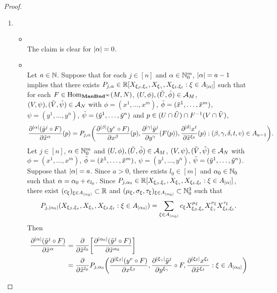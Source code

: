 \documentclass{book}
\begin{document}
\begin{proof}\
	\begin{enumerate}
		\item 
		\begin{itemize}
			\item {} \\
			The claim is clear for $|\alpha| = 0$. 
			\item {} \\
			Let $a \in \mathbb{N}$. Suppose that for each $j \in [n]$ and $\alpha \in \mathbb{N}_0^m$, $|\alpha| = a - 1$ implies that there exists $P_{j, \alpha} \in \mathbb{R}[X_{\xi_{\beta}, \xi_v}, X_{\xi_{\gamma}}, X_{\xi_{\delta}, \xi_t}: \xi \in A_{|\alpha|}]$ such that for each $F \in \operatorname{Hom}_{\operatorname*{\text{\textbf{ManBnd}}^{\infty}}}(M, N)$, $(U, \phi), (\tilde{U}, \tilde{\phi}) \in \mathcal{A}_M$, $(V, \psi), (\tilde{V}, \tilde{\psi}) \in \mathcal{A}_N$ with $\phi = (x^1, \ldots, x^m)$, $\tilde{\phi} = (\tilde{x}^1, \ldots, \tilde{x}^m)$, $\psi = (y^1, \ldots, y^n)$, $\tilde{\psi} = (\tilde{y}^1, \ldots, \tilde{y}^n)$ and $p \in (U \cap \tilde{U}) \cap F^{-1}(V \cap \tilde{V})$,
			$$\frac{\partial^{|\alpha|} (\tilde{y}^j \circ F)}{\partial \tilde{x}^{\alpha}}(p) = P_{j, \alpha}\bigg( \frac{\partial^{|\beta|} (y^{v} \circ F)}{\partial x^{\beta}}(p),  \frac{\partial^{|\gamma|} \tilde{y}^j}{\partial y^{\gamma}} (F(p)), \frac{\partial^{|\delta|} x^t}{\partial \tilde{x}^{\xi_{\delta}}}(p) : (\beta, \gamma, \delta, t, v) \in A_{a-1} \bigg).$$
			Let $j \in [n]$, $\alpha \in \mathbb{N}_0^m$ and $(U, \phi), (\tilde{U}, \tilde{\phi}) \in \mathcal{A}_M$, $(V, \psi), (\tilde{V}, \tilde{\psi}) \in \mathcal{A}_N$ with $\phi = (x^1, \ldots, x^m)$, $\tilde{\phi} = (\tilde{x}^1, \ldots, \tilde{x}^m)$, $\psi = (y^1, \ldots, y^n)$, $\tilde{\psi} = (\tilde{y}^1, \ldots, \tilde{y}^n)$. Suppose that $|\alpha| = a$. Since $a > 0$, there exists $l_0 \in [m]$ and $\alpha_0 \in \mathbb{N}_0$ such that $\alpha = \alpha_0 + e_{l_0}$. Since $P_{j, \alpha_0} \in \mathbb{R}[X_{\xi_{\beta}, \xi_v}, X_{\xi_{\gamma}}, X_{\xi_{\delta}, \xi_t}: \xi \in A_{|\alpha|}]$, there exist $(c_{\xi})_{\xi \in A_{|\alpha_0|}} \subset \mathbb{R}$ and $(\mu_{\xi}, \sigma_{\xi}, \tau_{\xi})_{\xi \in A_{|\alpha_0|}} \subset \mathbb{N}_0^3$ such that 
			$$P_{j, |\alpha_0|}(X_{\xi_{\beta}, \xi_v}, X_{\xi_{\gamma}}, X_{\xi_{\delta}, \xi_t}: \xi \in A_{|\alpha_0|}) = \sum_{\xi \in A_{|\alpha_0|}} c_{\xi} X_{\xi_{\beta}, \xi_v}^{\mu_{\xi}} X_{\xi_{\gamma}}^{\sigma_{\xi}} X_{\xi_{\delta}, \xi_t}^{\tau_{\xi}}.$$
			Then 
			\begin{align*}
				\frac{\p^{|\al|} (\tl{y}^j \circ F)}{\p \tl{x}^{\al}}
				& = \frac{\p }{\p \tl{x}^{l_0}} \bigg[ \frac{\p^{|\al_0|} (\tl{y}^j \circ F)}{\p \tl{x}^{\al_0}} \bigg] \\
				& = \frac{\p }{\p \tl{x}^{l_0}} P_{j, \al_0}\bigg( \frac{\p^{|\xi_{\be}|} (y^{v} \circ F)}{\p x^{\xi_{\be}}},  \frac{\p^{|\xi_{\gam}|} \tl{y}^j}{\p y^{\xi_{\gam}}} \circ F, \frac{\p^{|\xi_{\del}|} x^{\xi_t}}{\p \tl{x}^{\xi_{\del}}} : \xi \in A_{|\al_0|} \bigg) \\

\end{align*}
\end{itemize}
\end{enumerate}
\end{proof}
\end{document}
